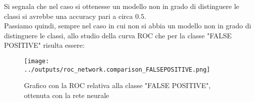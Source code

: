 Si segnala che nel caso si ottenesse un modello non in grado di distinguere le 
classi si avrebbe una accuracy pari a circa $0.5$.\\
Passiamo quindi, sempre nel caso in cui non si
abbia un modello non in grado di distinguere le classi, allo studio della curva 
ROC che per la classe "FALSE POSITIVE" risulta essere:
\begin{figure}[H]
    \centering
    \texttt{[image: ../outputs/roc\_network.comparison\_FALSEPOSITIVE.png]}
    \caption{Grafico con la ROC relativa alla classe "FALSE POSITIVE", ottenuta con 
    la rete neurale}
\end{figure}